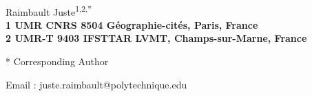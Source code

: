 \documentclass[10pt,letterpaper]{article}
\date{}
\begin{document}
\vspace*{0.35in}

\begin{flushleft}
{\Large\textbf{}
}
\newline
\\
Raimbault Juste\textsuperscript{1,2,*}
\\
\bigskip
\bf{1} UMR CNRS 8504 G{\'e}ographie-cit{\'e}s, Paris, France
\\
\bigskip
\bf{2} UMR-T 9403 IFSTTAR LVMT, Champs-sur-Marne, France

% 
%





* Corresponding Author

Email : juste.raimbault@polytechnique.edu

\end{flushleft}
\end{document}

